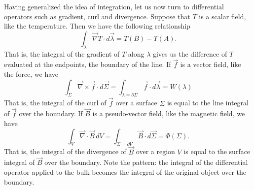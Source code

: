 Having generalized the idea of integration, let us now turn to differential operators such as gradient, curl and divergence. Suppose that $T$ is a scalar field, like the temperature. Then we have the following relationship
\begin{equation}\label{rp-cm-dg-gradientTheorem}
	\int_{\lambda} \vec{\nabla} T \cdot d\vec{\lambda} = T(B) - T(A).
\end{equation}
That is, the integral of the gradient of $T$ along $\lambda$ gives us the difference of $T$ evaluated at the endpoints, the boundary of the line. If $\vec{f}$ is a vector field, like the force, we have
\begin{equation}\label{rp-cm-dg-curlTheorem}
	\int_{\Sigma} \vec{\nabla} \times \vec{f} \cdot d\vec{\Sigma} = \int_{\lambda = \partial \Sigma} \vec{f} \cdot d\vec{\lambda} = W(\lambda)
\end{equation}
That is, the integral of the curl of $\vec{f}$ over a surface $\Sigma$ is equal to the line integral of $\vec{f}$ over the boundary. If $\vec{B}$ is a pseudo-vector field, like the magnetic field, we have
\begin{equation}\label{rp-cm-dg-divergenceTheorem}
	\int_{V} \vec{\nabla} \cdot \vec{B} \, dV = \int_{\Sigma = \partial V} \vec{B} \cdot d\vec{\Sigma} = \Phi(\Sigma).
\end{equation}
That is, the integral of the divergence of $\vec{B}$ over a region $V$ is equal to the surface integral of $\vec{B}$ over the boundary. Note the pattern: the integral of the differential operator applied to the bulk becomes the integral of the original object over the boundary.

